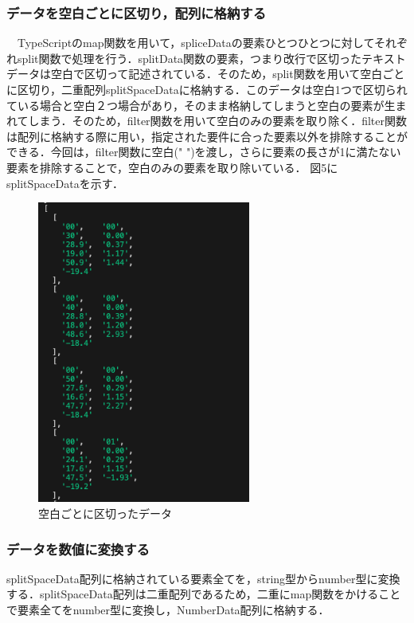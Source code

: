  \subsubsection{データを空白ごとに区切り，配列に格納する}
　TypeScriptのmap関数を用いて，spliceDataの要素ひとつひとつに対してそれぞれsplit関数で処理を行う．splitData関数の要素，つまり改行で区切ったテキストデータは空白で区切って記述されている．そのため，split関数を用いて空白ごとに区切り，二重配列splitSpaceDataに格納する．このデータは空白1つで区切られている場合と空白２つ場合があり，そのまま格納してしまうと空白の要素が生まれてしまう．そのため，filter関数を用いて空白のみの要素を取り除く．filter関数は配列に格納する際に用い，指定された要件に合った要素以外を排除することができる．今回は，filter関数に空白(" ")を渡し，さらに要素の長さが1に満たない要素を排除することで，空白のみの要素を取り除いている．
 図5にsplitSpaceDataを示す．
 \begin{figure}[h]
   \centering
   \caption{空白ごとに区切ったデータ}
   \includegraphics[width=70mm]{fig/splitSpaceData.png}
 \end{figure}
 
 \subsubsection{データを数値に変換する}
 splitSpaceData配列に格納されている要素全てを，string型からnumber型に変換する．splitSpaceData配列は二重配列であるため，二重にmap関数をかけることで要素全てをnumber型に変換し，NumberData配列に格納する．
 
